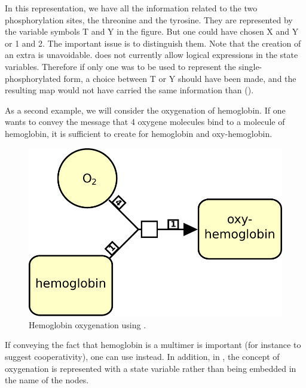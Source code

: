 In this representation, we have all the information related to the two phosphorylation sites, the threonine and the tyrosine. They are represented by the variable symbols T and Y in the figure. But one could have chosen X and Y or 1 and 2. The important issue is to distinguish them. Note that the creation of an extra  is unavoidable. \SBGNPDLone does not currently allow logical expressions in the state variables. Therefore if only one  was to be used to represent the single-phosphorylated form, a choice between T or Y should have been made, and the resulting map would not have carried the same information than  ().

As a second example, we will consider the oxygenation of hemoglobin. If one wants to convey the message that 4 oxygene molecules bind to a molecule of hemoglobin, it is sufficient to create  for hemoglobin and oxy-hemoglobin. 

\begin{figure}[H]
  \centering
  \includegraphics[scale = 0.4]{le_images/hemoglobin-macromolecule}
  \caption{Hemoglobin oxygenation using .}
  \label{fig:hemoglobin-macromolecule}
\end{figure}

If conveying the fact that hemoglobin is a multimer is important (for instance to suggest cooperativity), one can use  instead. In addition, in , the concept of oxygenation is represented with a state variable rather than being embedded in the name of the nodes.

